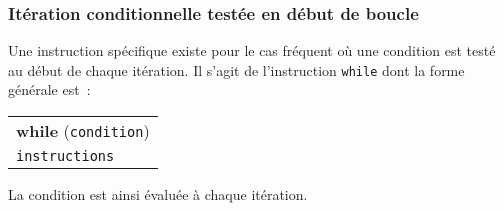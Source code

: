 \subsubsection{It\'eration conditionnelle test\'ee en d\'ebut de boucle}
Une instruction  sp\'ecifique existe pour le  cas fr\'equent  o\`u une
condition est test\'e au  d\'ebut de chaque  it\'eration. Il s'agit de
l'instruction \texttt{while} dont la forme g\'en\'erale est~:
\begin{center}
  \begin{tabular}{l}
    \textbf{while} (\texttt{condition}) \\
    \qquad \texttt{instructions} \\
  \end{tabular}
\end{center}
La condition est ainsi \'evalu\'ee \`a chaque it\'eration.
